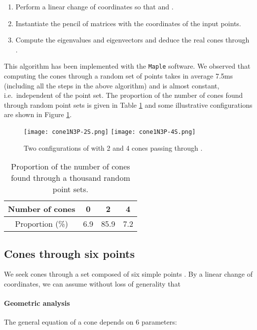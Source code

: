 \documentclass[5p]{elsarticle}
\newcommand{\com}[1]{{\color{black} #1}}
\begin{document}
\begin{enumerate}
	\item Perform a linear change of coordinates \com{so that}  and . 
	\item Instantiate the pencil of matrices  with the coordinates of the input points.
	\item Compute the eigenvalues and eigenvectors and deduce the real cones through .
\end{enumerate} 

This algorithm has been implemented with the {\tt Maple} software. We observed that \com{computing} the \com{cones} through a random set of points takes in average 7.5ms \com{(including all the steps in the above algorithm)} and is almost constant,  \com{i.e.~independent} of the point set. The proportion of the number of \com{cones} found through random point sets is given in Table \ref{tab:cone1N3P} and some illustrative configurations are shown in Figure \ref{fig:cone1N3P}.

\begin{figure}[ht!]
\centering	
   \texttt{[image: cone1N3P-2S.png]}
   \hspace{4em}
   \texttt{[image: cone1N3P-4S.png]}
   \caption{Two configurations of  with 2 and 4 cones passing through .}\label{fig:cone1N3P}
\end{figure}  

\begin{table}[ht!]
\begin{center}
\begin{tabular}{c|c|c|c|}
 Number of cones & 0 & 2 & 4 \\ 
	 \hline
Proportion (\%)	 &  6.9 & 85.9 & 7.2 \\
\hline	
\end{tabular}
\caption{Proportion of the number of \com{cones} found through a thousand random point sets.}\label{tab:cone1N3P}
\end{center}
\end{table}


\subsection{Cones through six points}\label{sec:C6P}
\com{We seek} cones through a set  composed of six simple points . By a linear change of coordinates, we can assume without loss of generality that
 

\paragraph{Geometric analysis}
The general equation of a cone depends on 6 parameters:
\end{document}
